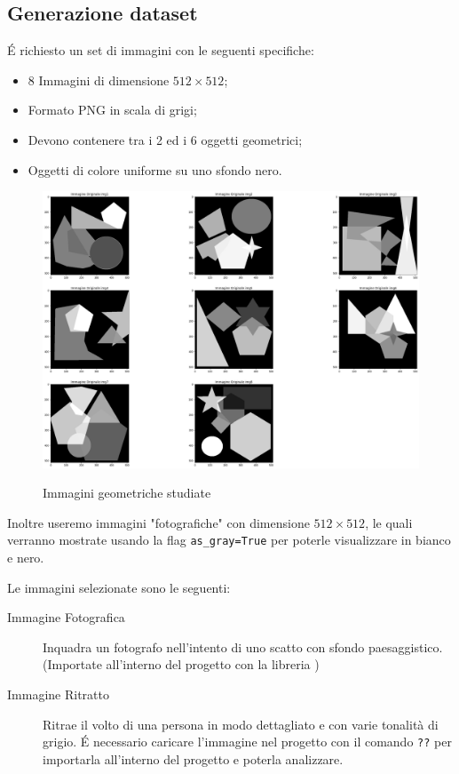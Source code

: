{\color{bblue}\subsection{Generazione dataset}}
É richiesto un set di immagini con le seguenti specifiche: 
\begin{itemize}
    \item 8 Immagini di dimensione $512 \times 512$;
    \item Formato PNG in scala di grigi;
    \item Devono contenere tra i 2 ed i 6 oggetti geometrici;
    \item Oggetti di colore uniforme su uno sfondo nero.
\end{itemize}

\begin{figure}[H]
    \centering
    \includegraphics[width=0.5\linewidth]{./imgRel/dataset.png}\label{fig:datasetgeometriche}
    \caption{Immagini geometriche studiate}
\end{figure}

Inoltre useremo immagini "fotografiche" con dimensione $512 \times 512$, le quali verranno mostrate usando la flag 
\verb|as_gray=True| per 
poterle visualizzare in bianco e nero.

Le immagini selezionate sono le seguenti:
\begin{description}
    \item[Immagine Fotografica] Inquadra un fotografo nell'intento di uno scatto con sfondo 
    paesaggistico. (Importate all'interno del progetto con la libreria )
    \item[Immagine Ritratto] Ritrae il volto di una persona in modo dettagliato e con 
    varie tonalità di grigio. É necessario caricare l'immagine nel progetto con il comando \verb|??|
    per importarla all'interno del progetto e poterla analizzare.
\end{description}

